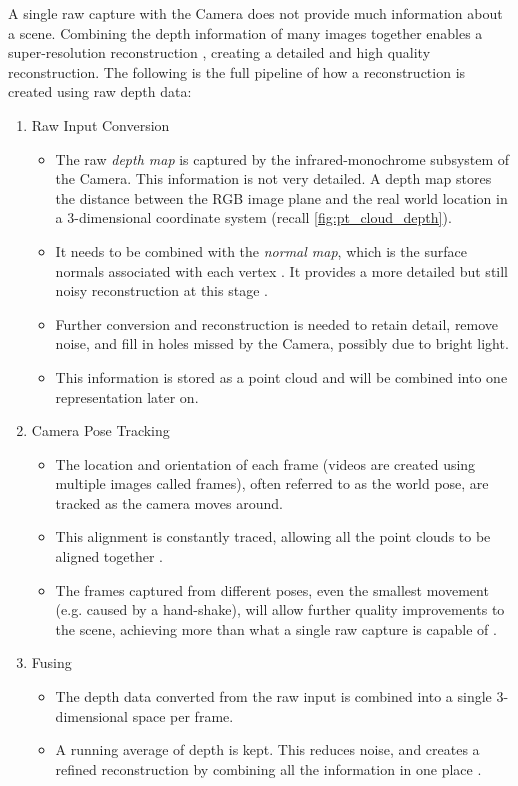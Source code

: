 A single raw capture with the Camera does not provide much information about a scene. Combining the depth information of many images together enables a super-resolution reconstruction \cite{ms-3d-paper}, creating a detailed and high quality reconstruction. The following is the full pipeline of how a reconstruction is created using raw depth data:
\newpage
\begin{enumerate}
  \item Raw Input Conversion
    \begin{itemize}
      \item The raw \textit{depth map} is captured by the infrared-monochrome subsystem of the Camera. This information is not very detailed. A depth map stores the distance between the RGB image plane and the real world location in a 3-dimensional coordinate system (recall \autoref{fig:pt_cloud_depth}).
      \item It needs to be combined with the \textit{normal map}, which is the surface normals associated with each vertex \cite{szeliski-book}. It provides a more detailed but still noisy reconstruction at this stage \cite{kinect-doc}. 
      \item Further conversion and reconstruction is needed to retain detail, remove noise, and fill in holes missed by the Camera, possibly due to bright light.
      \item This information is stored as a point cloud and will be combined into one representation later on.
    \end{itemize}

  \item Camera Pose Tracking
    \begin{itemize}
      \item The location and orientation of each frame (videos are created using multiple images called frames), often referred to as the world pose, are tracked as the camera moves around.
      \item This alignment is constantly traced, allowing all the point clouds to be aligned together \cite{kinect-doc}. 
      \item The frames captured from different poses, even the smallest movement (e.g. caused by a hand-shake), will allow further quality improvements to the scene, achieving more than what a single raw capture is capable of \cite{ms-3d-paper}.
    \end{itemize}

  \item Fusing 
    \begin{itemize}
      \item The depth data converted from the raw input is combined into a single 3-dimensional space per frame.
      \item A running average of depth is kept. This reduces noise, and creates a refined reconstruction by combining all the information in one place \cite{kinect-doc} \cite{ms-3d-paper}. 
    \end{itemize}


\end{enumerate}
